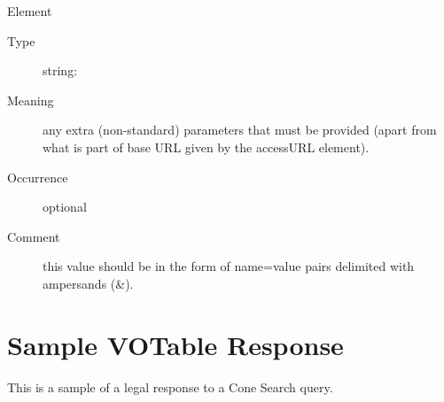 \documentclass[11pt,a4paper]{ivoa}
\begin{document}
\begin{generated}
\begin{bigdescription}
	\item[Element \xmlel{extras}] 
	\begin{description}
		\item[Type] string: 
		\item[Meaning] any extra (non-standard) parameters that must be 
provided (apart from what is part of base URL given by the accessURL element).
		\item[Occurrence] optional \item[Comment] this value should be in the
form of name=value pairs delimited with ampersands (\&).  
	\end{description}

\end{bigdescription}
\endgroup

\endgroup \end{generated}

\appendix \section{Sample VOTable Response} \label{app:responsesample}
This is a sample of a legal response to a Cone Search query.
\end{document}
